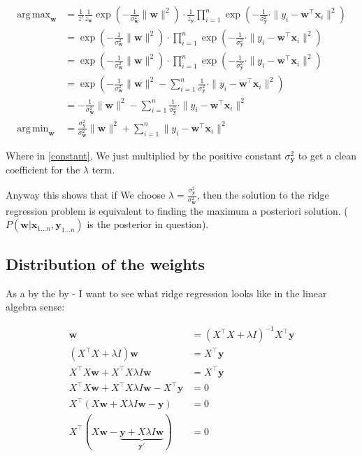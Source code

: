 \documentclass{article}
\DeclareMathOperator*{\argmax}{arg\,max}
\DeclareMathOperator*{\argmin}{arg\,min}
\begin{document}
		\begin{align}
			\argmax_{\mathbf{w}} &= \frac{1}{z'} \frac{1}{z_{\mathbf{w}}}\exp\left(-\frac{1}{\sigma^2_{\mathbf{w}}}\|\mathbf{w}\|^2 \right) \cdot \frac{1}{z_{\mathbf{y}}}\prod^n_{i=1}\exp\left(-\frac{1}{\sigma^2_{\mathbf{y}}}\cdot\|y_i - \mathbf{w}^\top\mathbf{x}_i \|^2\right)\\
			&= \exp\left(-\frac{1}{\sigma^2_{\mathbf{w}}}\|\mathbf{w}\|^2 \right) \cdot \prod^n_{i=1}\exp\left(-\frac{1}{\sigma^2_{\mathbf{y}}}\cdot\|y_i - \mathbf{w}^\top\mathbf{x}_i \|^2\right)\\
			&= \exp\left(-\frac{1}{\sigma^2_{\mathbf{w}}}\|\mathbf{w}\|^2 \right) \cdot \prod^n_{i=1}\exp\left(-\frac{1}{\sigma^2_{\mathbf{y}}}\cdot\|y_i - \mathbf{w}^\top\mathbf{x}_i \|^2\right)\\
			&= \exp\left(-\frac{1}{\sigma^2_{\mathbf{w}}}\|\mathbf{w}\|^2  - \sum^n_{i=1} \frac{1}{\sigma^2_{\mathbf{y}}}\cdot\|y_i - \mathbf{w}^\top\mathbf{x}_i \|^2\right)\\
			&= -\frac{1}{\sigma^2_{\mathbf{w}}}\|\mathbf{w}\|^2  - \sum^n_{i=1} \frac{1}{\sigma^2_{\mathbf{y}}}\cdot\|y_i - \mathbf{w}^\top\mathbf{x}_i \|^2\label{constant}\\
			\argmin_{\mathbf{w}}&= \frac{\sigma^2_{\mathbf{y}}}{\sigma^2_{\mathbf{w}}}\|\mathbf{w}\|^2  + \sum^n_{i=1} \|y_i - \mathbf{w}^\top\mathbf{x}_i \|^2\
		\end{align}
		
		Where in \ref{constant}, We just multiplied by the positive constant $\sigma^2_{\mathbf{y}}$ to get a clean coefficient for the $\lambda$ term.
		
		Anyway this shows that if We choose $\lambda=\frac{\sigma^2_{\mathbf{y}}}{\sigma^2_{\mathbf{w}}}$, then the solution to the ridge regression problem is equivalent to finding the maximum a posteriori solution. ($P(\mathbf{w}|\mathbf{x}_{1\ldots n}, \mathbf{y}_{1\ldots n})$ is the posterior in question).
		
	\subsection{Distribution of the weights}
	
		As a by the by - I want to see what ridge regression looks like in the linear algebra sense:
		
		\begin{align}
			\mathbf{w} &= (X^\top X + \lambda I)^{-1}X^\top \mathbf{y}\\
			(X^\top X + \lambda I)\mathbf{w} &= X^\top \mathbf{y}\\
			X^\top X\mathbf{w} + X^\top X\lambda I\mathbf{w} &= X^\top \mathbf{y}\\
			X^\top X\mathbf{w} + X^\top X\lambda I\mathbf{w} - X^\top \mathbf{y}&= 0\\
			X^\top (X\mathbf{w} + X\lambda I\mathbf{w} -  \mathbf{y}) &= 0\\
			X^\top (X\mathbf{w} -  \underbrace{\mathbf{y} + X\lambda I\mathbf{w}}_{\mathbf{y}'} ) &= 0
		\end{align}
		
\end{document}

